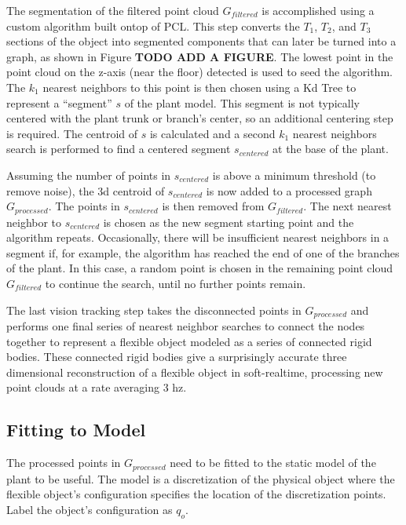 \documentclass[runningheads,a4paper]{llncs}
\begin{document}
The segmentation of the filtered point cloud $G_{filtered}$ is accomplished using a custom algorithm built ontop of PCL. This step converts the $T_1$, $T_2$, and $T_3$ sections of the object into segmented components that can later be turned into a graph, as shown in Figure \textbf{TODO ADD A FIGURE}. The lowest point in the point cloud on the z-axis (near the floor) detected is used to seed the algorithm. The $k_1$ nearest neighbors to this point is then chosen using a Kd Tree to represent a “segment” $s$ of the plant model. This segment is not typically centered with the plant trunk or branch’s center, so an additional centering step is required. The centroid of $s$ is calculated and a second $k_1$ nearest neighbors search is performed to find a centered segment $s_{centered}$ at the base of the plant.

Assuming the number of points in $s_{centered}$ is above a minimum threshold (to remove noise), the 3d centroid of $s_{centered}$ is now added to a processed graph $G_{processed}$. The points in $s_{centered}$ is then removed from $G_{filtered}$. The next nearest neighbor to $s_{centered}$ is chosen as the new segment starting point and the algorithm repeats. Occasionally, there will be insufficient nearest neighbors in a segment if, for example, the algorithm has reached the end of one of the branches of the plant. In this case, a random point is chosen in the remaining point cloud $G_{filtered}$ to continue the search, until no further points remain.

The last vision tracking step takes the disconnected points in $G_{processed}$ and performs one final series of nearest neighbor searches to connect the nodes together to represent a flexible object modeled as a series of connected rigid bodies. These connected rigid bodies give a surprisingly accurate three dimensional reconstruction of a flexible object in soft-realtime, processing new point clouds at a rate averaging 3 hz.

\subsection{Fitting to Model \label{sec-fit}}

The processed points in $G_{processed}$ need to be fitted to the static model of the plant to be useful. The model is a discretization of the physical object where the flexible object's configuration specifies the location of the discretization points. Label the object’s configuration as $q_o$. 
\end{document}
